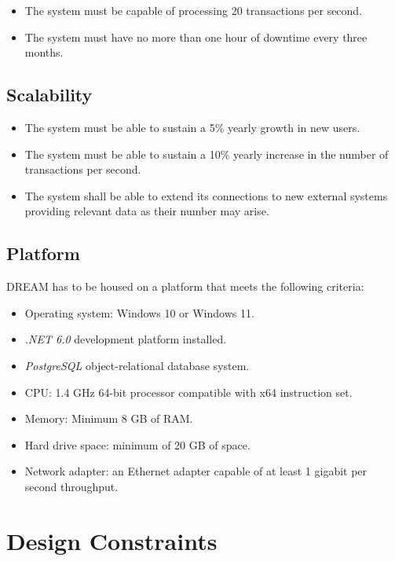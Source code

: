 \begin{itemize}
    \item The system must be capable of processing 20 transactions per second.
    \item The system must have no more than one hour of downtime every three months.
\end{itemize}

\subsection{Scalability}

\begin{itemize}
    \item The system must be able to sustain a 5\% yearly growth in new users.
    \item The system must be able to sustain a 10\% yearly increase in the number of transactions per second.
    \item The system shall be able to extend its connections to new external systems providing relevant data as their number may arise.
\end{itemize}

\subsection{Platform}

DREAM has to be housed on a platform that meets the following criteria:

\begin{itemize}
    \item Operating system: Windows 10 or Windows 11.    
    \item \textit{.NET 6.0} development platform installed.
    \item \textit{PostgreSQL} object-relational database system.
    \item CPU: 1.4 GHz 64-bit processor compatible with x64 instruction set.
    \item Memory: Minimum 8 GB of RAM. 
    \item Hard drive space: minimum of 20 GB of space.
    \item Network adapter: an Ethernet adapter capable of at least 1 gigabit per second throughput.
\end{itemize}

\section{Design Constraints}


